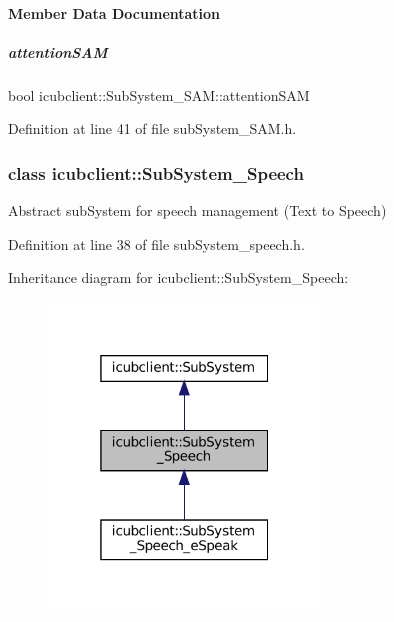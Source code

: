 \paragraph{Member Data Documentation}
\mbox{\label{group__icubclient__subsystems_a8caf6370a0094554bf67793add9ca565}} 
\subparagraph{\texorpdfstring{attention\+S\+AM}{attentionSAM}}
{\footnotesize\ttfamily bool icubclient\+::\+Sub\+System\+\_\+\+S\+A\+M\+::attention\+S\+AM}



Definition at line 41 of file sub\+System\+\_\+\+S\+A\+M.\+h.

\label{classicubclient_1_1SubSystem__Speech}
\subsubsection{class icubclient\+:\+:Sub\+System\+\_\+\+Speech}
Abstract sub\+System for speech management (Text to Speech) 

Definition at line 38 of file sub\+System\+\_\+speech.\+h.



Inheritance diagram for icubclient\+:\+:Sub\+System\+\_\+\+Speech\+:
\nopagebreak
\begin{figure}[H]
\begin{center}
\leavevmode
\includegraphics[width=205pt]{classicubclient_1_1SubSystem__Speech__inherit__graph}
\end{center}
\end{figure}
